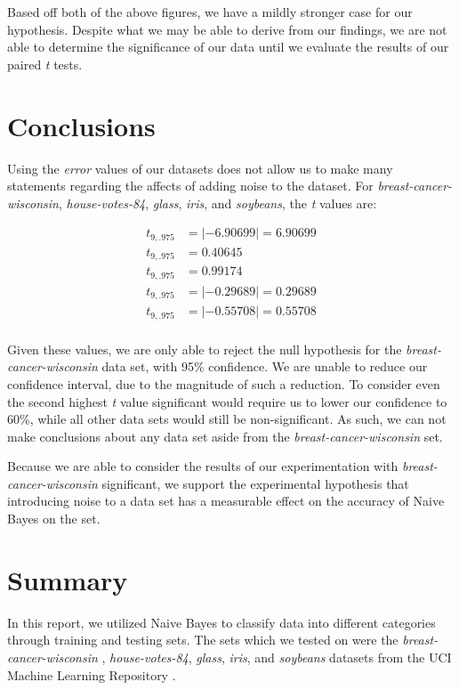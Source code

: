 \documentclass[twoside,11pt]{article}
\begin{document}
	Based off both of the above figures, we have a mildly stronger case for our hypothesis. Despite what we may be able to derive from our findings, we are not able to determine the significance of our data until we evaluate the results of our paired \textit{t} tests.

	\clearpage
	\section{Conclusions}\label{sec:conclusions}
	
	Using the \textit{error} values of our datasets does not allow us to make many statements regarding the affects of adding noise to the dataset. For \textit{breast-cancer-wisconsin}, \textit{house-votes-84}, \textit{glass}, \textit{iris}, and \textit{soybeans}, the \textit{t} values are:
	
	\begin{align*}
		t_{9,.975} &= |-6.90699| = 6.90699 \\
		t_{9,.975} &= 0.40645 \\
		t_{9,.975} &= 0.99174 \\
		t_{9,.975} &= |-0.29689| = 0.29689 \\
		t_{9,.975} &= |-0.55708| = 0.55708 \\
	\end{align*}
	
	Given these values, we are only able to reject the null hypothesis for the \textit{breast-cancer-wisconsin} data set, with 95\% confidence. We are unable to reduce our confidence interval, due to the magnitude of such a reduction. To consider even the second highest \textit{t} value significant would require us to lower our confidence to 60\%, while all other data sets would still be non-significant. As such, we can not make conclusions about any data set aside from the \textit{breast-cancer-wisconsin} set.
	
	Because we are able to consider the results of our experimentation with \textit{breast-cancer-wisconsin} significant, we support the experimental hypothesis that introducing noise to a data set has a measurable effect on the accuracy of Naive Bayes on the set.

	\section{Summary}\label{sec:summary}
	
	 In this report, we utilized Naive Bayes to classify data into different categories through training and testing sets. The sets which we tested on were the \textit{breast-cancer-wisconsin} \citep{ARTICLE:1}, \textit{house-votes-84}, \textit{glass}, \textit{iris}, and \textit{soybeans} datasets from the UCI Machine Learning Repository \citep{Dua:2019}.
	
\end{document}
